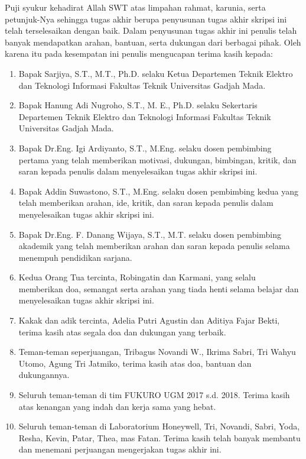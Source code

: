 \documentclass[../thesis.tex]{subfiles}
\begin{document}
\vspace{0.5cm}

Puji syukur kehadirat Allah SWT atas limpahan rahmat, karunia, serta petunjuk-Nya
sehingga tugas akhir berupa penyusunan tugas akhir skripsi ini telah terselesaikan dengan baik.
Dalam penyusunan tugas akhir ini penulis telah banyak mendapatkan arahan, bantuan, serta
dukungan dari berbagai pihak. Oleh karena itu pada kesempatan ini penulis mengucapan terima
kasih kepada:

\begin{enumerate}
\item{Bapak Sarjiya, S.T., M.T., Ph.D. selaku Ketua Departemen Teknik Elektro dan Teknologi Informasi Fakultas Teknik Universitas Gadjah Mada.}
\item {Bapak Hanung Adi Nugroho, S.T., M. E., Ph.D. selaku Sekertaris Departemen Teknik Elektro dan Teknologi Informasi Fakultas Teknik Universitas Gadjah Mada.}
\item{Bapak Dr.Eng. Igi Ardiyanto, S.T., M.Eng. selaku dosen pembimbing pertama yang telah memberikan motivasi, dukungan, bimbingan, kritik, dan saran kepada penulis dalam menyelesaikan tugas akhir skripsi ini.}
\item{Bapak Addin Suwastono, S.T., M.Eng. selaku dosen pembimbing kedua yang telah memberikan arahan, ide, kritik, dan saran kepada penulis dalam menyelesaikan tugas akhir skripsi ini.}
\item{Bapak Dr.Eng. F. Danang Wijaya, S.T., M.T. selaku dosen pembimbing akademik yang telah memberikan arahan dan saran kepada penulis selama menempuh pendidikan sarjana.}
\item{Kedua Orang Tua tercinta, Robingatin dan Karmani, yang selalu memberikan doa, semangat serta arahan yang tiada henti selama belajar dan menyelesaikan tugas akhir skripsi ini.}
\item{Kakak dan adik tercinta, Adelia Putri Agustin dan Aditiya Fajar Bekti, terima kasih atas segala doa dan dukungan yang terbaik.}
\item{Teman-teman seperjuangan, Tribagus Novandi W., Ikrima Sabri, Tri Wahyu Utomo, Agung Tri Jatmiko, terima kasih atas doa, bantuan dan dukungannya.}
\item{Seluruh teman-teman di tim FUKURO UGM 2017 s.d. 2018. Terima kasih atas kenangan yang indah dan kerja sama yang hebat.}
\item{Seluruh teman-teman di Laboratorium Honeywell, Tri, Novandi, Sabri, Yoda, Resha, Kevin, Patar, Thea, mas Fatan. Terima kasih telah banyak membantu dan menemani perjuangan mengerjakan tugas akhir ini.}

\end{enumerate}
\end{document}
